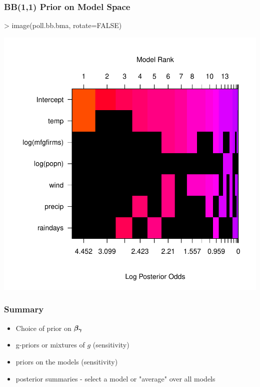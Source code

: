 \documentclass[]{beamer}
\begin{document}
\begin{frame}[fragile]\frametitle{BB(1,1) Prior on Model Space}


\begin{Schunk}
\begin{Sinput}
> image(poll.bb.bma, rotate=FALSE)
\end{Sinput}
\end{Schunk}
\includegraphics{16-bma-006}
\end{frame}


\begin{frame}\frametitle{Summary}

\begin{itemize}
  \item Choice of prior on $\boldsymbol{\beta_\gamma}$ 
  \item g-priors or mixtures of $g$ (sensitivity)
  \item priors on the models (sensitivity)
  \item posterior summaries - select a model or "average" over all models
\end{itemize}


\end{frame}
\end{document}
